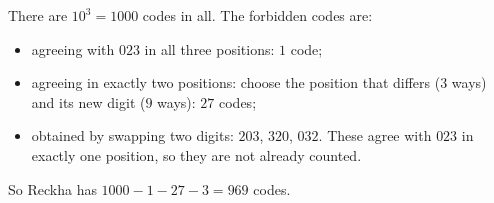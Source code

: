 There are $10^3=1000$ codes in all. The forbidden codes are:
\begin{itemize}
\item agreeing with $023$ in all three positions: $1$ code;
\item agreeing in exactly two positions: choose the position that differs ($3$ ways) and its new digit ($9$ ways): $27$ codes;
\item obtained by swapping two digits: $203$, $320$, $032$. These agree with $023$ in exactly one position, so they are not already counted.
\end{itemize}
So Reckha has $1000-1-27-3=\boxed{969}$ codes.
